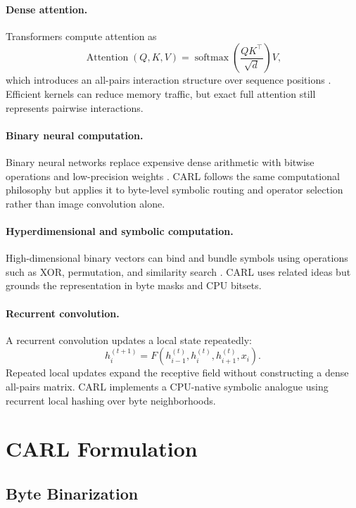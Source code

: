 \documentclass[10pt]{article}
\newcommand{\CARL}{\textsc{CARL}}
\begin{document}
\paragraph{Dense attention.}
Transformers compute attention as
\[
\operatorname{Attention}(Q,K,V)
=
\operatorname{softmax}\left(\frac{QK^\top}{\sqrt{d}}\right)V,
\]
which introduces an all-pairs interaction structure over sequence positions \cite{vaswani2017attention}. Efficient kernels can reduce memory traffic, but exact full attention still represents pairwise interactions.

\paragraph{Binary neural computation.}
Binary neural networks replace expensive dense arithmetic with bitwise operations and low-precision weights \cite{courbariaux2016binarized,rastegari2016xnor}. \CARL{} follows the same computational philosophy but applies it to byte-level symbolic routing and operator selection rather than image convolution alone.

\paragraph{Hyperdimensional and symbolic computation.}
High-dimensional binary vectors can bind and bundle symbols using operations such as XOR, permutation, and similarity search \cite{kanerva2009hyperdimensional}. \CARL{} uses related ideas but grounds the representation in byte masks and CPU bitsets.

\paragraph{Recurrent convolution.}
A recurrent convolution updates a local state repeatedly:
\[
h_i^{(t+1)} = F(h_{i-1}^{(t)}, h_i^{(t)}, h_{i+1}^{(t)}, x_i).
\]
Repeated local updates expand the receptive field without constructing a dense all-pairs matrix. \CARL{} implements a CPU-native symbolic analogue using recurrent local hashing over byte neighborhoods.

\section{CARL Formulation}

\subsection{Byte Binarization}
\end{document}

